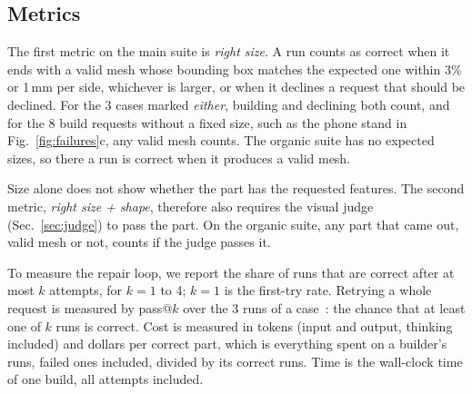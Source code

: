 \subsection{Metrics}
The first metric on the main suite is \emph{right size}.
A run counts as correct when it ends with a valid mesh whose bounding box matches the expected one within 3\% or 1\,mm per side, whichever is larger, or when it declines a request that should be declined.
For the 3 cases marked \emph{either}, building and declining both count, and for the 8 build requests without a fixed size, such as the phone stand in Fig.~\ref{fig:failures}c, any valid mesh counts.
The organic suite has no expected sizes, so there a run is correct when it produces a valid mesh.

Size alone does not show whether the part has the requested features.
The second metric, \emph{right size + shape}, therefore also requires the visual judge (Sec.~\ref{sec:judge}) to pass the part.
On the organic suite, any part that came out, valid mesh or not, counts if the judge passes it.

To measure the repair loop, we report the share of runs that are correct after at most $k$ attempts, for $k = 1$ to 4; $k = 1$ is the first-try rate.
Retrying a whole request is measured by pass@$k$ over the 3 runs of a case~\cite{chen2021codex}: the chance that at least one of $k$ runs is correct.
Cost is measured in tokens (input and output, thinking included) and dollars per correct part, which is everything spent on a builder's runs, failed ones included, divided by its correct runs.
Time is the wall-clock time of one build, all attempts included.

